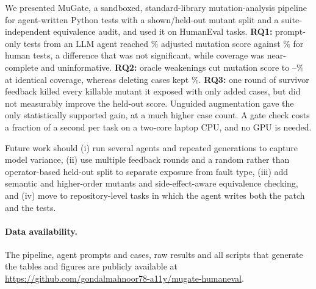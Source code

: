 \documentclass[runningheads]{llncs}
\begin{document}
We presented MuGate, a sandboxed, standard-library mutation-analysis pipeline for agent-written Python tests with a shown/held-out mutant split and a suite-independent equivalence audit, and used it on \nTasks{} HumanEval tasks. \textbf{RQ1:} prompt-only tests from an LLM agent reached \msVanilla\% adjusted mutation score against \msHuman\% for human tests, a difference that was not significant, while coverage was near-complete and uninformative. \textbf{RQ2:} oracle weakenings cut mutation score to \msWFour--\msWThree\% at identical coverage, whereas deleting cases kept \msWFive\%. \textbf{RQ3:} one round of survivor feedback killed every killable mutant it exposed with only \gateCases{} added cases, but did not measurably improve the held-out score. Unguided augmentation gave the only statistically supported gain, at a much higher case count. A gate check costs a fraction of a second per task on a two-core laptop CPU, and no GPU is needed.

Future work should (i) run several agents and repeated generations to capture model variance, (ii) use multiple feedback rounds and a random rather than operator-based held-out split to separate exposure from fault type, (iii) add semantic and higher-order mutants and side-effect-aware equivalence checking, and (iv) move to repository-level tasks in which the agent writes both the patch and the tests.

\paragraph{Data availability.} The pipeline, agent prompts and cases, raw results and all scripts that generate the tables and figures are publicly available at \url{https://github.com/gondalmahnoor78-a11y/mugate-humaneval}.



\end{document}
